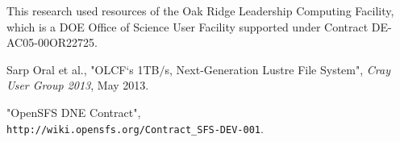 \documentclass[conference,compsoc]{IEEEtran}
\begin{document}
This research used resources of the Oak Ridge Leadership Computing Facility, 
which is a DOE Office of Science User Facility supported under Contract DE-AC05-00OR22725.



%
%
%
\begin{thebibliography}{1}

Sarp Oral et al., "OLCF`s 1TB$/$s, Next-Generation Lustre File System", \emph{Cray User Group 2013}, May 2013.

"OpenSFS DNE Contract", \\\texttt{http://wiki.opensfs.org/Contract\_SFS-DEV-001}.

\end{thebibliography}


\end{document}
